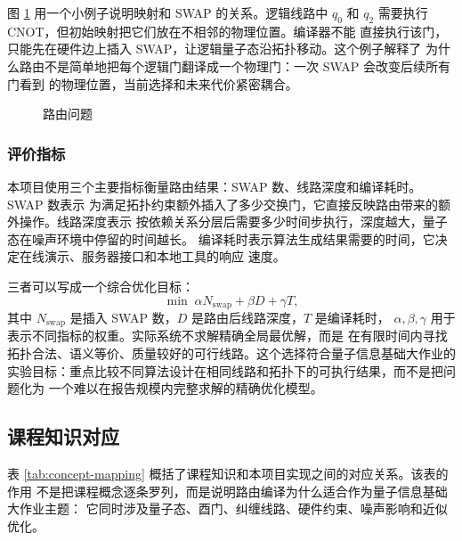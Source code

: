 图 \ref{fig:routing-model} 用一个小例子说明映射和 SWAP 的关系。逻辑线路中
$q_0$ 和 $q_2$ 需要执行 CNOT，但初始映射把它们放在不相邻的物理位置。编译器不能
直接执行该门，只能先在硬件边上插入 SWAP，让逻辑量子态沿拓扑移动。这个例子解释了
为什么路由不是简单地把每个逻辑门翻译成一个物理门：一次 SWAP 会改变后续所有门看到
的物理位置，当前选择和未来代价紧密耦合。

\begin{figure}[H]
  \centering
  
  \caption{路由问题}
  \label{fig:routing-model}
\end{figure}

\subsubsection*{评价指标}

本项目使用三个主要指标衡量路由结果：SWAP 数、线路深度和编译耗时。SWAP 数表示
为满足拓扑约束额外插入了多少交换门，它直接反映路由带来的额外操作。线路深度表示
按依赖关系分层后需要多少时间步执行，深度越大，量子态在噪声环境中停留的时间越长。
编译耗时表示算法生成结果需要的时间，它决定在线演示、服务器接口和本地工具的响应
速度。

三者可以写成一个综合优化目标：
\[
  \min \; \alpha N_{\mathrm{swap}}+\beta D+\gamma T ,
\]
其中 $N_{\mathrm{swap}}$ 是插入 SWAP 数，$D$ 是路由后线路深度，$T$ 是编译耗时，
$\alpha,\beta,\gamma$ 用于表示不同指标的权重。实际系统不求解精确全局最优解，而是
在有限时间内寻找拓扑合法、语义等价、质量较好的可行线路。这个选择符合量子信息基础大作业的
实验目标：重点比较不同算法设计在相同线路和拓扑下的可执行结果，而不是把问题化为
一个难以在报告规模内完整求解的精确优化模型。

\subsection{课程知识对应}

表 \ref{tab:concept-mapping} 概括了课程知识和本项目实现之间的对应关系。该表的作用
不是把课程概念逐条罗列，而是说明路由编译为什么适合作为量子信息基础大作业主题：
它同时涉及量子态、酉门、纠缠线路、硬件约束、噪声影响和近似优化。


